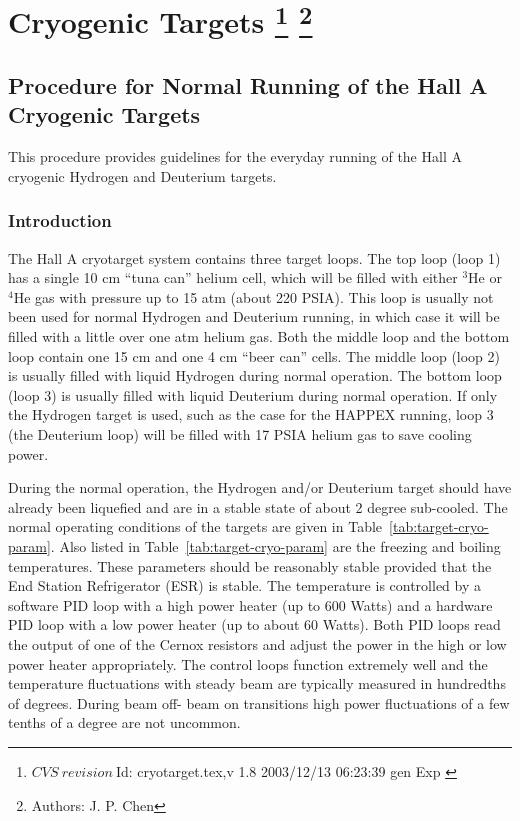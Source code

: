 \chapter[Cryogenic Targets]{Cryogenic Targets
\footnote{
  $CVS~revision~ $Id: cryotarget.tex,v 1.8 2003/12/13 06:23:39 gen Exp $ $ }
\footnote{Authors: J. P. Chen }
}

\section{Procedure for Normal Running of the Hall A Cryogenic Targets}
This procedure provides guidelines for the everyday running of the Hall A
cryogenic Hydrogen and Deuterium targets.

\subsection{Introduction }
The Hall A cryotarget system contains three target loops. The top loop (loop 1)
has a single 10 cm ``tuna can'' helium cell, which will be filled with either 
$^3$He or $^4$He gas with pressure up to 15 atm (about 220 PSIA). This loop 
is usually not been used for normal Hydrogen and Deuterium running, in which 
case it will be filled with a little over one atm helium gas. Both the middle 
loop and the bottom loop contain one 15 cm and one 4 cm  ``beer can'' cells.
The middle loop (loop 2) is usually filled with liquid Hydrogen during normal 
operation.
The bottom loop (loop 3) is usually filled with liquid Deuterium during normal
operation. If only the Hydrogen target is used, such as the case for   
the HAPPEX running, loop 3 (the Deuterium loop) 
will be filled with 17 PSIA helium gas to save cooling power.

\par
During the normal operation, the Hydrogen and/or Deuterium target should
have already been liquefied and are in a stable state of 
about 2 degree sub-cooled. 
The normal operating conditions of the targets are given in Table~\ref{tab:target-cryo-param}.
Also listed in Table~\ref{tab:target-cryo-param} are the freezing and boiling temperatures.
These parameters should be reasonably stable provided that the End Station
Refrigerator (ESR) is stable. The
temperature is controlled by a software PID loop with a high power heater (up
to 600 Watts) and a hardware PID loop with a low power heater (up to about 
60 Watts). Both PID loops read the output of one
of the Cernox resistors and adjust the power in the high or low power heater 
appropriately.
The control loops function extremely well and the temperature fluctuations with
steady beam are typically measured in hundredths of degrees. During beam off-
beam on transitions high power fluctuations of a few tenths of a degree are
not uncommon.

